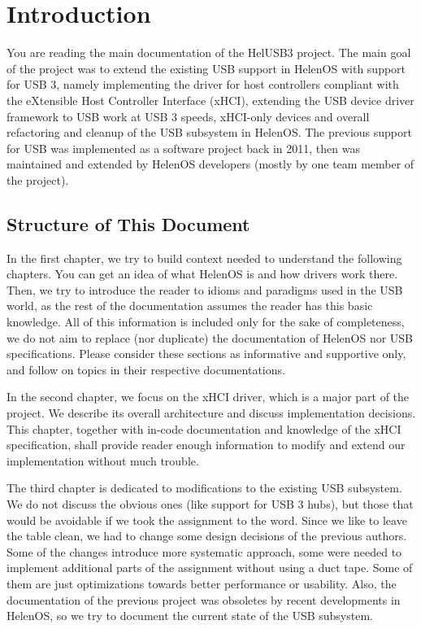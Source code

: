 \chapter{Introduction}

You are reading the main documentation of the HelUSB3 project. The main goal of
the project was to extend the existing USB support in HelenOS with support for
USB 3, namely implementing the driver for host controllers compliant with the
eXtensible Host Controller Interface (xHCI), extending the USB device driver
framework to USB work at USB 3 speeds, xHCI-only devices and overall refactoring and cleanup of
the USB subsystem in HelenOS. The previous support for USB was implemented as
a software project back in 2011, then was maintained and extended by HelenOS
developers (mostly by one team member of the project).

\section{Structure of This Document}


In the first chapter, we try to build context needed to understand the
following chapters. You can get an idea of what HelenOS is and how drivers work
there. Then, we try to introduce the reader to idioms and paradigms used in the
USB world, as the rest of the documentation assumes the reader has this basic
knowledge. All of this information is included only for the sake of
completeness, we do not aim to replace (nor duplicate) the documentation of
HelenOS nor USB specifications. Please consider these sections as informative
and supportive only, and follow on topics in their respective documentations.

In the second chapter, we focus on the xHCI driver, which is a major part of
the project. We describe its overall architecture and discuss implementation
decisions. This chapter, together with in-code documentation and knowledge of the
xHCI specification, shall provide reader enough information to modify and
extend our implementation without much trouble.

The third chapter is dedicated to modifications to the existing USB subsystem.
We do not discuss the obvious ones (like support for USB 3 hubs), but those
that would be avoidable if we took the assignment to the word. Since we like to
leave the table clean, we had to change some design decisions of the previous
authors. Some of the changes introduce more systematic approach, some were
needed to implement additional parts of the assignment without using a duct
tape. Some of them are just optimizations towards better performance or
usability. Also, the documentation of the previous project was obsoletes by
recent developments in HelenOS, so we try to document the current state of
the USB subsystem.


